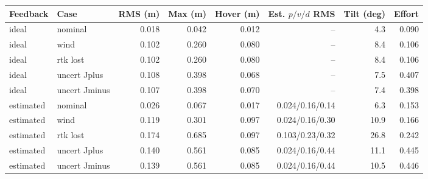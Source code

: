 \begin{tabular}{llrrrrrr}\toprule
Feedback & Case & RMS (m) & Max (m) & Hover (m) & Est. $p/v/d$ RMS & Tilt (deg) & Effort \\\midrule
ideal & nominal & 0.018 & 0.042 & 0.012 & -- & 4.3 & 0.090 \\
ideal & wind & 0.102 & 0.260 & 0.080 & -- & 8.4 & 0.106 \\
ideal & rtk lost & 0.102 & 0.260 & 0.080 & -- & 8.4 & 0.106 \\
ideal & uncert Jplus & 0.108 & 0.398 & 0.068 & -- & 7.5 & 0.407 \\
ideal & uncert Jminus & 0.107 & 0.398 & 0.070 & -- & 7.4 & 0.398 \\
estimated & nominal & 0.026 & 0.067 & 0.017 & 0.024/0.16/0.14 & 6.3 & 0.153 \\
estimated & wind & 0.119 & 0.301 & 0.097 & 0.024/0.16/0.30 & 10.9 & 0.166 \\
estimated & rtk lost & 0.174 & 0.685 & 0.097 & 0.103/0.23/0.32 & 26.8 & 0.242 \\
estimated & uncert Jplus & 0.140 & 0.561 & 0.085 & 0.024/0.16/0.44 & 11.1 & 0.445 \\
estimated & uncert Jminus & 0.139 & 0.561 & 0.085 & 0.024/0.16/0.44 & 10.5 & 0.446 \\
\bottomrule\end{tabular}

